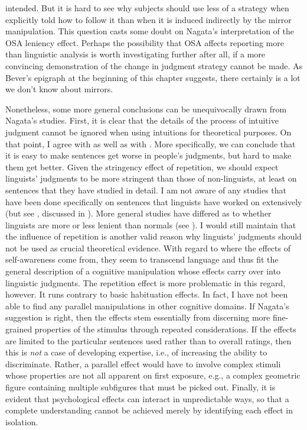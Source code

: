 intended. But it is hard to see why subjects should use less of a strategy when explicitly told how to follow it than when it is induced indirectly by the mirror manipulation. This question casts some doubt on Nagata's interpretation of the OSA leniency effect. Perhaps the possibility that OSA affects reporting more than linguistic analysis is worth investigating further after all, if a more convincing demonstration of the change in judgment strategy cannot be made. As Bever's epigraph at the beginning of this chapter suggests, there certainly is a lot we don't know about mirrors.

Nonetheless, some more general conclusions can be unequivocally drawn from Nagata's studies. First, it is clear that the details of the process of intuitive judgment cannot be ignored when using intuitions for theoretical purposes. On that point, I agree with \citeauthor{CarrollEtAl1981} as well as with \citeauthor{Nagata1989c}. More specifically, we can conclude that it is easy to make sentences get worse in people's judgments, but hard to make them get better. Given the stringency effect of repetition, we should expect linguists' judgments to be more stringent than those of non-linguists, at least on sentences that they have studied in detail. I am not aware of any studies that have been done specifically on sentences that linguists have worked on extensively (but see \citet{Snyder1994}, discussed in ). More general studies have differed as to whether linguists are more or less lenient than normals (see ). I would still maintain that the influence of repetition is another valid reason why linguists' judgments should not be used as crucial theoretical evidence. With regard to where the effects of self-awareness come from, they seem to transcend language and thus fit the general description of a cognitive manipulation whose effects carry over into linguistic judgments. The repetition effect is more problematic in this regard, however. It runs contrary to basic habituation effects. In fact, I have not been able to find any parallel manipulations in other cognitive domains. If Nagata's suggestion is right, then the effects stem essentially from discerning more fine-grained properties of the stimulus through repeated considerations. If the effects are limited to the particular sentences used rather than to overall ratings, then this is \textit{not} a case of developing expertise, i.e., of increasing the ability to discriminate. Rather, a parallel effect would have to involve complex stimuli whose properties are not all apparent on first exposure, e.g., a complex geometric figure containing multiple subfigures that must be picked out. Finally, it is evident that psychological effects can interact in unpredictable ways, so that a complete understanding cannot be achieved merely by identifying each effect in isolation.

